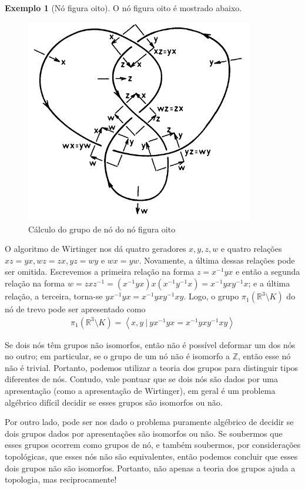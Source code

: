 \documentclass[a4paper,portuguese,11pt,twoside, leqno]{book}
\theoremstyle{definition}
\newtheorem{example}{Exemplo}[section]
\begin{document}
	\begin{example}[Nó figura oito]
		O nó figura oito é mostrado abaixo.
		\begin{figure}[H]
			\begin{center}
				\includegraphics[width=10cm]{gruponooito.png}
			\end{center}\caption{Cálculo do grupo de nó do nó figura oito}
			\label{grupo no de oito}	
		\end{figure}
		\par\vspace{0.3cm} O algoritmo de Wirtinger nos dá quatro geradores $x,y,z,w$ e quatro relações $xz = yx, wz = zx, yz = wy$ e $wx = yw$. Novamente, a última dessas relações pode ser omitida. Escrevemos a primeira relação na forma $z = x^{-1}yx$ e então a segunda relação na forma $w = zxz^{-1} = (x^{-1}yx)x(x^{-1}y^{-1}x) = x^{-1}yxy^{-1}x$; e a última relação, a terceira, torna-se $yx^{-1}yx = x^{-1}yxy^{-1}xy$. Logo, o grupo $\pi_1(\mathbb{R}^3\setminus K)$ do nó de trevo pode ser apresentado como
		\begin{align*}
		\pi_1(\mathbb{R}^3\setminus K) = \left< x,y \ | \ yx^{-1}yx = x^{-1}yxy^{-1}xy \right>
		\end{align*}
	\end{example}
	\par\vspace{0.3cm} Se dois nós têm grupos não isomorfos, então não é possível deformar um dos nós no outro; em particular, se o grupo de um nó não é isomorfo a $\mathbb{Z}$, então esse nó não é trivial. Portanto, podemos utilizar a teoria dos grupos para distinguir tipos diferentes de nós. Contudo, vale pontuar que se dois nós são dados por uma apresentação (como a apresentação de Wirtinger), em geral é um problema algébrico difícil decidir se esses grupos são isomorfos ou não.
	\par\vspace{0.3cm} Por outro lado, pode ser nos dado o problema puramente algébrico de decidir se dois grupos dados por apresentações são isomorfos ou não. Se soubermos que esses grupos ocorrem como grupos de nó, e também soubermos, por considerações topológicas, que esses nós não são equivalentes, então podemos concluir que esses dois grupos não são isomorfos. Portanto, não apenas a teoria dos grupos ajuda a topologia, mas reciprocamente!
	
\end{document}
